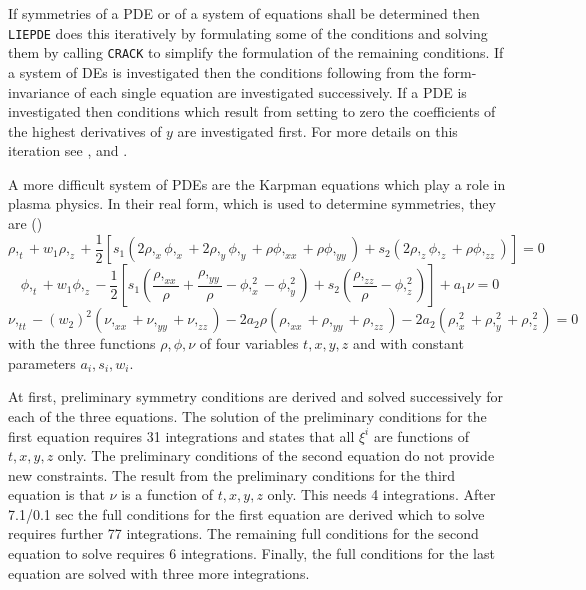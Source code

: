 If symmetries of a PDE or of a system of equations shall be determined then
{\tt LIEPDE} does this iteratively by formulating some of the conditions and
solving them by calling {\tt CRACK} to simplify the formulation of the
remaining conditions. If a system of DEs is investigated then the conditions
following from the form-invariance of each single equation are investigated
successively. If a PDE is investigated then conditions which result from
setting to zero the coefficients of the highest derivatives of $y$ are
investigated first. For more details on this iteration see \cite{Alex},
\cite{Step} and \cite{LIEPDE}.

A more difficult system of PDEs are the Karpman equations \cite{Karp}
which play a role in plasma physics. In their real form, which is used to
determine symmetries, they are (\cite{Cham})
\[\rho,_t+w_1\rho,_z+\frac{1}{2}\left[s_1(2\rho,_x\phi,_x+2\rho,_y\phi,_y
  +\rho\phi,_{xx}+\rho\phi,_{yy})+
  s_2(2\rho,_z\phi,_z+\rho\phi,_{zz})\right] = 0\]
\[\phi,_t+w_1\phi,_z-\frac{1}{2}\left[s_1\left(\frac{\rho,_{xx}}{\rho}
  +\frac{\rho,_{yy}}{\rho}-\phi,_x^2-\phi,_y^2\right)+
  s_2\left(\frac{\rho,_{zz}}{\rho}-\phi,_z^2\right)\right]+a_1\nu = 0\]
\[\nu,_{tt}-(w_2)^2(\nu,_{xx}+\nu,_{yy}+\nu,_{zz})-
2a_2\rho(\rho,_{xx}+\rho,_{yy}+\rho,_{zz})-2a_2(\rho,_x^2+\rho,_y^2+\rho,_z^2) = 0\]
with the three functions $\rho,\phi,\nu$ of four variables $t,x,y,z$ and
with constant parameters $a_i,s_i,w_i.$

At first, preliminary symmetry conditions are
derived and solved successively
for each of the three equations.
The solution
of the preliminary conditions for the
first equation
requires 31 integrations and states that all $\xi^i$ are
functions of $t,x,y,z$ only.
The preliminary conditions of the second equation do not provide new
constraints.
The result from the preliminary conditions for the third equation
is that $\nu$ is a function of $t,x,y,z$ only. This needs 4
integrations.
After 7.1/0.1 sec the full conditions for the first equation are derived
which to solve requires further 77 integrations.
The remaining full conditions for the second equation
to solve requires 6 integrations. Finally,
the full conditions for the last equation are
solved with three more integrations.

